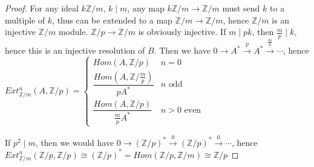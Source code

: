 \documentclass[../main.tex]{subfiles}
\begin{document}
\begin{proof}
For any ideal $k\mathbb Z/m$, $k\mid m$, any map $k\mathbb Z/m\to\mathbb Z/m$ must send $k$ to a multiple of $k$, thus can be extended to a map $\mathbb Z/m\to\mathbb Z/m$, hence $\mathbb Z/m$ is an injective $\mathbb Z/m$ module. $\mathbb Z/p\to\mathbb Z/m$ is obviously injective. If $m\mid pk$, then $\frac{m}{p}\mid k$, hence this is an injective resolution of $B$. Then we have $0\to A^*\xrightarrow{p} A^*\xrightarrow{\frac{m}{p}}\cdots$, hence $Ext^n_{\mathbb Z/m}(A,\mathbb Z/p)=\begin{cases}
Hom(A,\mathbb Z/p) &n=0 \\
\dfrac{Hom(A,\mathbb Z/\frac{m}{p})}{pA^*} &n\text{ odd} \\
\dfrac{Hom(A,\mathbb Z/p)}{\frac{m}{p}A^*} &n>0\text{ even}
\end{cases}$ \par
If $p^2\mid m$, then we would have $0\to (\mathbb Z/p)^*\xrightarrow{0}(\mathbb Z/p)^*\xrightarrow{0}\cdots$, hence $Ext^n_{\mathbb Z/m}(\mathbb Z/p,\mathbb Z/p)\cong(\mathbb Z/p)^*=Hom(\mathbb Z/p,\mathbb Z/m)\cong\mathbb Z/p$
\end{proof}
\end{document}
